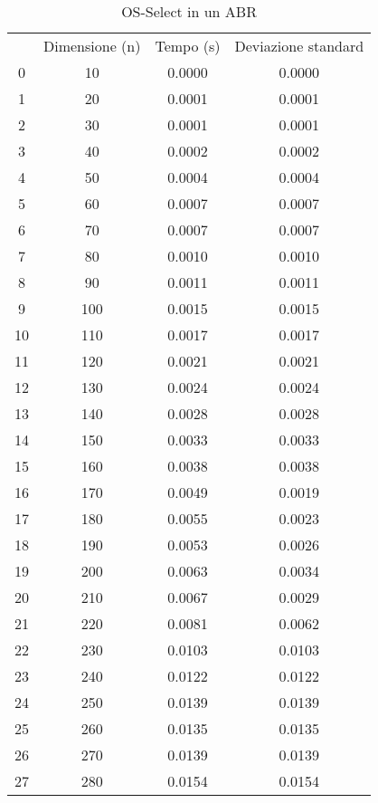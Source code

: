 \begin{table}
\centering
\caption{OS-Select in un ABR}
\label{OS-Select in un ABR}
\begin{adjustbox}{width=1\textwidth/2}
\begin{tabular}{|c|c|c|c|}
\hline
 & Dimensione (n) & Tempo (s) & Deviazione standard \\
0 & 10 & 0.0000 & 0.0000 \\
\cline{1-4}
1 & 20 & 0.0001 & 0.0001 \\
\cline{1-4}
2 & 30 & 0.0001 & 0.0001 \\
\cline{1-4}
3 & 40 & 0.0002 & 0.0002 \\
\cline{1-4}
4 & 50 & 0.0004 & 0.0004 \\
\cline{1-4}
5 & 60 & 0.0007 & 0.0007 \\
\cline{1-4}
6 & 70 & 0.0007 & 0.0007 \\
\cline{1-4}
7 & 80 & 0.0010 & 0.0010 \\
\cline{1-4}
8 & 90 & 0.0011 & 0.0011 \\
\cline{1-4}
9 & 100 & 0.0015 & 0.0015 \\
\cline{1-4}
10 & 110 & 0.0017 & 0.0017 \\
\cline{1-4}
11 & 120 & 0.0021 & 0.0021 \\
\cline{1-4}
12 & 130 & 0.0024 & 0.0024 \\
\cline{1-4}
13 & 140 & 0.0028 & 0.0028 \\
\cline{1-4}
14 & 150 & 0.0033 & 0.0033 \\
\cline{1-4}
15 & 160 & 0.0038 & 0.0038 \\
\cline{1-4}
16 & 170 & 0.0049 & 0.0019 \\
\cline{1-4}
17 & 180 & 0.0055 & 0.0023 \\
\cline{1-4}
18 & 190 & 0.0053 & 0.0026 \\
\cline{1-4}
19 & 200 & 0.0063 & 0.0034 \\
\cline{1-4}
20 & 210 & 0.0067 & 0.0029 \\
\cline{1-4}
21 & 220 & 0.0081 & 0.0062 \\
\cline{1-4}
22 & 230 & 0.0103 & 0.0103 \\
\cline{1-4}
23 & 240 & 0.0122 & 0.0122 \\
\cline{1-4}
24 & 250 & 0.0139 & 0.0139 \\
\cline{1-4}
25 & 260 & 0.0135 & 0.0135 \\
\cline{1-4}
26 & 270 & 0.0139 & 0.0139 \\
\cline{1-4}
27 & 280 & 0.0154 & 0.0154 \\

\end{tabular}
\end{adjustbox}
\end{table}
